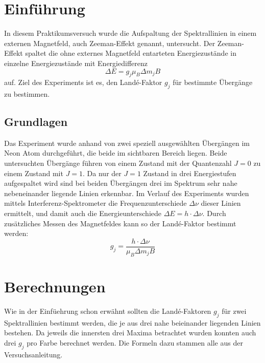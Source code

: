 \documentclass[a4paper,parskip,11pt, DIV12]{scrreprt}
\begin{document}
	
	
		\chapter{Einführung}
	
	In diesem Praktikumsversuch wurde die Aufspaltung der Spektrallinien in einem externen Magnetfeld, auch Zeeman-Effekt genannt, untersucht. Der Zeeman-Effekt spaltet die ohne externes Magnetfeld entarteten Energiezustände in einzelne Energiezustände mit Energiedifferenz
	\begin{equation}
	\label{Energiedifferenz}
	\Delta E = g_j \mu_B \Delta m_j B 
	\end{equation}
auf. Ziel des Experiments ist es, den Landé-Faktor $g_j $ für bestimmte Übergänge zu bestimmen. 
	\section{Grundlagen}
	Das Experiment wurde anhand von zwei speziell ausgewählten Übergängen im Neon Atom durchgeführt, die beide im sichtbaren Bereich liegen. Beide untersuchten Übergänge führen von einem Zustand mit der Quantenzahl $ J = 0 $ zu einem Zustand mit $J = 1$. Da nur der $J = 1$ Zustand in drei Energiestufen aufgespaltet wird sind bei beiden Übergängen drei im Spektrum sehr nahe nebeneinander liegende Linien erkennbar. Im Verlauf des Experiments wurden mittels Interferenz-Spektrometer die Frequenzunterschiede $\Delta \nu$  dieser Linien ermittelt, und damit auch die Energieunterschiede $\Delta E = h \cdot \Delta \nu$. Durch zusätzliches Messen des Magnetfeldes kann so der Landé-Faktor bestimmt werden:
	\begin{equation}
	\label{Landé-Faktor}
	g_j = \frac{h \cdot \Delta \nu}{\mu_B \Delta m_j B}
	\end{equation}
	
	
	\chapter{Berechnungen}
	
	Wie in der Einfüehrung schon erwähnt sollten die Landé-Faktoren $g_j$ für zwei Spektrallinien bestimmt werden, die je aus drei nahe beieinander liegenden Linien bestehen. Da jeweils die innersten drei Maxima betrachtet wurden konnten auch drei $g_j$ pro Farbe berechnet werden. Die Formeln dazu stammen alle aus der Versuchsanleitung. 
	
\end{document}
